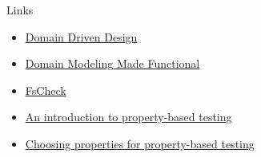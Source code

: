 \documentclass[t]{beamer}
\begin{document}
\begin{frame}[label={sec:orge6d5d17}]{Links}
\begin{itemize}
\item \href{https://fsharpforfunandprofit.com/ddd/}{Domain Driven Design}
\item \href{https://fsharpforfunandprofit.com/books/}{Domain Modeling Made Functional}
\item \href{https://github.com/fscheck/FsCheck}{FsCheck}
\item \href{https://fsharpforfunandprofit.com/posts/property-based-testing/}{An introduction to property-based testing}
\item \href{https://fsharpforfunandprofit.com/posts/property-based-testing-2/}{Choosing properties for property-based testing}
\end{itemize}
\end{frame}
\end{document}

